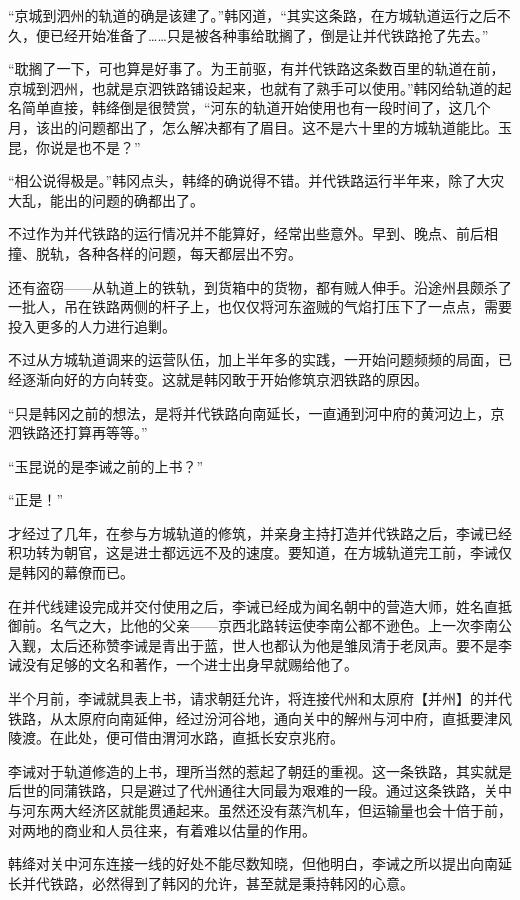 “京城到泗州的轨道的确是该建了。”韩冈道，“其实这条路，在方城轨道运行之后不久，便已经开始准备了……只是被各种事给耽搁了，倒是让并代铁路抢了先去。”

“耽搁了一下，可也算是好事了。为王前驱，有并代铁路这条数百里的轨道在前，京城到泗州，也就是京泗铁路铺设起来，也就有了熟手可以使用。”韩冈给轨道的起名简单直接，韩绛倒是很赞赏，“河东的轨道开始使用也有一段时间了，这几个月，该出的问题都出了，怎么解决都有了眉目。这不是六十里的方城轨道能比。玉昆，你说是也不是？”

“相公说得极是。”韩冈点头，韩绛的确说得不错。并代铁路运行半年来，除了大灾大乱，能出的问题的确都出了。

不过作为并代铁路的运行情况并不能算好，经常出些意外。早到、晚点、前后相撞、脱轨，各种各样的问题，每天都层出不穷。

还有盗窃——从轨道上的铁轨，到货箱中的货物，都有贼人伸手。沿途州县颇杀了一批人，吊在铁路两侧的杆子上，也仅仅将河东盗贼的气焰打压下了一点点，需要投入更多的人力进行追剿。

不过从方城轨道调来的运营队伍，加上半年多的实践，一开始问题频频的局面，已经逐渐向好的方向转变。这就是韩冈敢于开始修筑京泗铁路的原因。

“只是韩冈之前的想法，是将并代铁路向南延长，一直通到河中府的黄河边上，京泗铁路还打算再等等。”

“玉昆说的是李诫之前的上书？”

“正是！”

才经过了几年，在参与方城轨道的修筑，并亲身主持打造并代铁路之后，李诫已经积功转为朝官，这是进士都远远不及的速度。要知道，在方城轨道完工前，李诫仅是韩冈的幕僚而已。

在并代线建设完成并交付使用之后，李诫已经成为闻名朝中的营造大师，姓名直抵御前。名气之大，比他的父亲——京西北路转运使李南公都不逊色。上一次李南公入觐，太后还称赞李诫是青出于蓝，世人也都认为他是雏凤清于老凤声。要不是李诫没有足够的文名和著作，一个进士出身早就赐给他了。

半个月前，李诫就具表上书，请求朝廷允许，将连接代州和太原府【并州】的并代铁路，从太原府向南延伸，经过汾河谷地，通向关中的解州与河中府，直抵要津风陵渡。在此处，便可借由渭河水路，直抵长安京兆府。

李诫对于轨道修造的上书，理所当然的惹起了朝廷的重视。这一条铁路，其实就是后世的同蒲铁路，只是避过了代州通往大同最为艰难的一段。通过这条铁路，关中与河东两大经济区就能贯通起来。虽然还没有蒸汽机车，但运输量也会十倍于前，对两地的商业和人员往来，有着难以估量的作用。

韩绛对关中河东连接一线的好处不能尽数知晓，但他明白，李诫之所以提出向南延长并代铁路，必然得到了韩冈的允许，甚至就是秉持韩冈的心意。

